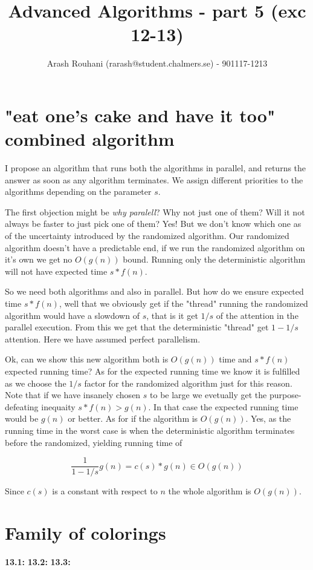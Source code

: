 \documentclass[a4paper,11pt]{article}
\title{Advanced Algorithms - part 5 (exc 12-13)}
\author{Arash Rouhani (rarash@student.chalmers.se) - 901117-1213}
\begin{document}
\maketitle

\section{"eat one's cake and have it too" combined algorithm}

I propose an algorithm that runs both the algorithms in parallel,
and returns the answer as soon as any algorithm terminates.
We assign different priorities to the algorithms depending on
the parameter $s$.

The first objection might be \emph{why paralell}? Why not just
one of them? Will it not always be faster to just pick one of them?
Yes! But we don't know which one as of the uncertainty introduced
by the randomized algorithm.
Our randomized algorithm
doesn't have a predictable end, if we run the randomized algorithm
on it's own we get no $O(g(n))$ bound. Running only the deterministic
algorithm will not have expected time $s*f(n)$.

So we need both algorithms and also in parallel.
But how do we ensure expected time $s*f(n)$, well
that we obviously get if the "thread" running the randomized
algorithm would have a slowdown of $s$, that is it get
$1/s$ of the attention in the parallel execution.
From this we get that the deterministic "thread" get
$1-1/s$ attention. Here we have assumed
perfect parallelism.

Ok, can we show this new algorithm both is $O(g(n))$ time and
$s*f(n)$ expected running time? As for the expected running time
we know it is fulfilled as we choose the $1/s$ factor for
the randomized algorithm just for this reason. Note that if
we have insanely chosen $s$ to be large we evetually
get the purpose-defeating inequaity $s*f(n) > g(n)$.
In that case the expected running time would be $g(n)$ or better.
As for if the algorithm is $O(g(n))$. Yes, as the running
time in the worst case is when the deterministic algorithm terminates
before the randomized, yielding running time of

\[
\frac{1}{1-1/s}g(n) = c(s)*g(n) \in O(g(n))
\]

Since $c(s)$ is a constant with respect to $n$ the whole
algorithm is $O(g(n))$.

\section{Family of colorings}

\textbf{13.1:}
\textbf{13.2:}
\textbf{13.3:}
\end{document}
